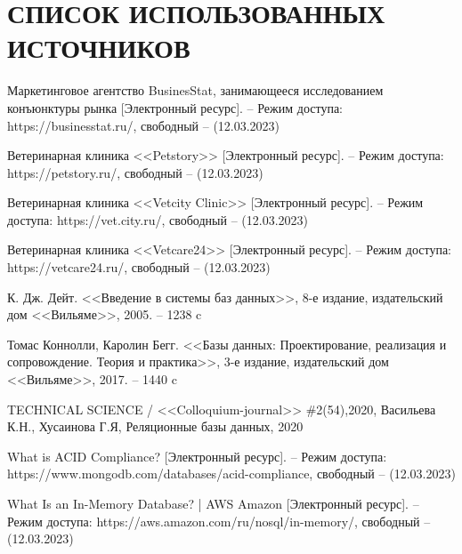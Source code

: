 \section*{СПИСОК ИСПОЛЬЗОВАННЫХ ИСТОЧНИКОВ}

\begingroup
\renewcommand{\section}[2]{}
\begin{thebibliography}{}
	
		Маркетинговое агентство  BusinesStat, занимающееся исследованием конъюнктуры рынка [Электронный ресурс]. -- Режим доступа: 
		https://businesstat.ru/,
		свободный -- (12.03.2023)
		
		Ветеринарная клиника <<Petstory>> [Электронный ресурс]. -- Режим доступа:  https://petstory.ru/,
		свободный -- (12.03.2023)
		
		Ветеринарная клиника <<Vetcity Clinic>> [Электронный ресурс]. -- Режим доступа:  https://vet.city.ru/,
		свободный -- (12.03.2023)
		
		Ветеринарная клиника <<Vetcare24>> [Электронный ресурс]. -- Режим доступа: https://vetcare24.ru/,
		свободный -- (12.03.2023)
			
		К. Дж. Дейт.
		<<Введение в системы баз данных>>, 8-е издание, издательский дом <<Вильяме>>,
		2005. -- 1238 c 
		
		Томас Коннолли, Каролин Бегг.
		<<Базы данных: Проектирование, реализация и сопровождение. Теория и практика>>, 3-е издание, издательский дом <<Вильяме>>,
		2017. -- 1440 c
		
		TECHNICAL SCIENCE / <<Colloquium-journal>> \#2(54),2020,
		Васильева К.Н., Хусаинова Г.Я,
		Реляционные базы данных,
		2020

		What is ACID Compliance? [Электронный ресурс]. -- Режим доступа: 	https://www.mongodb.com/databases/acid-compliance,
		свободный -- (12.03.2023)
		
		What Is an In-Memory Database? | AWS Amazon [Электронный ресурс]. -- Режим доступа: https://aws.amazon.com/ru/nosql/in-memory/,
		свободный -- (12.03.2023)
		
		
		
	

\end{thebibliography}
\endgroup

\pagebreak
